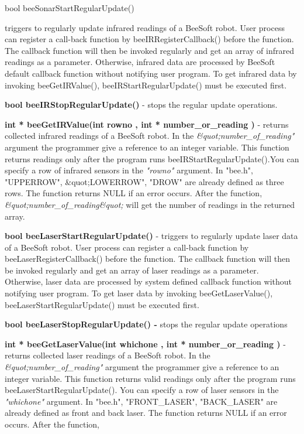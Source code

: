 {\begin{enumerate}{\bf \item bool
    beeSonarStartRegularUpdate()}
  triggers to regularly update infrared readings of a BeeSoft robot.
  User process can register a call-back function by
  beeIRRegisterCallback() before the function. The callback function
  will then be invoked regularly and get an array of infrared readings
  as a parameter. Otherwise, infrared data are processed by BeeSoft
  default callback function without notifying user program. To get
  infrared data by invoking beeGetIRValue(), beeIRStartRegularUpdate()
  must be executed first.\item {\bf bool beeIRStopRegularUpdate()} -
  stops the regular update operations. \item {\bf int *
    beeGetIRValue(int rowno , int * number\_or\_reading )} - returns
  collected infrared readings of a BeeSoft robot. In the {\it
    \&quot;number\_of\_reading"} argument the programmer give a
  reference to an integer variable. This function returns readings
  only after the program runs beeIRStartRegularUpdate().You can
  specify a row of infrared sensors in the {\it "rowno"} argument. In
  "bee.h", "UPPERROW", \&quot;LOWERROW", "DROW" are already defined as
  three rows. The function returns NULL if an error occurs. After the
  function, {\it \&quot;number\_of\_reading\&quot;} will get the
  number of readings in the returned array.\item {\bf bool
    beeLaserStartRegularUpdate()} - triggers to regularly update laser
  data of a BeeSoft robot. User process can register a call-back
  function by beeLaserRegisterCallback() before the function. The
  callback function will then be invoked regularly and get an array of
  laser readings as a parameter. Otherwise, laser data are processed
  by system defined callback function without notifying user program.
  To get laser data by invoking beeGetLaserValue(),
  beeLaserStartRegularUpdate() must be executed first.\item {\bf bool
    beeLaserStopRegularUpdate() - }stops the regular update operations
\item {\bf int * beeGetLaserValue(int whichone , int *
    number\_or\_reading )} - returns collected laser readings of a
  BeeSoft robot. In the {\it \&quot;number\_of\_reading"} argument the
  programmer give a reference to an integer variable. This function
  returns valid readings only after the program runs
  beeLaserStartRegularUpdate(). You can specify a row of laser sensors
  in the {\it "whichone"} argument. In "bee.h", "FRONT\_LASER",
  "BACK\_LASER" are already defined as front and back laser. The
  function returns NULL if an error occurs. After the function, {\it
}
\end{enumerate}}
